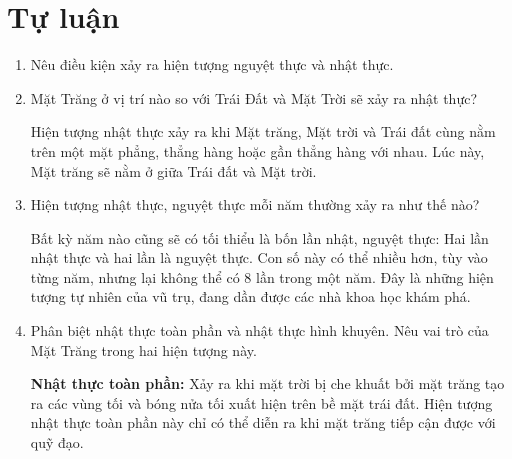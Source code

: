 \section{Tự luận}
\begin{enumerate}[label=\bfseries Câu \arabic*:]
	\item {}
	
	{
		Nêu điều kiện xảy ra hiện tượng nguyệt thực và nhật thực.
	}
	
	
	\item {}
	
	
	{
		Mặt Trăng ở vị trí nào so với Trái Đất và Mặt Trời sẽ xảy ra nhật thực?
	}
	
	\hideall
	{
		Hiện tượng nhật thực xảy ra khi Mặt trăng, Mặt trời và Trái đất cùng nằm trên một mặt phẳng, thẳng hàng hoặc gần thẳng hàng với nhau. Lúc này, Mặt trăng sẽ nằm ở giữa Trái đất và Mặt trời.
	}
	\item {}
	
	
	{
		Hiện tượng nhật thực, nguyệt thực mỗi năm thường xảy ra như thế nào?
	}
	
	\hideall
	{
		Bất kỳ năm nào cũng sẽ có tối thiểu là bốn lần nhật, nguyệt thực: Hai lần nhật thực và hai lần là nguyệt thực. Con số này có thể nhiều hơn, tùy vào từng năm, nhưng lại không thể có 8 lần trong một năm. Đây là những hiện tượng tự nhiên của vũ trụ, đang dần được các nhà khoa học khám phá.
	}
	\item {}
	
	
	{
		Phân biệt nhật thực toàn phần và nhật thực hình khuyên. Nêu vai trò của Mặt Trăng trong hai hiện tượng này.
	}
	
	\hideall
	{
		\textbf{ Nhật thực toàn phần: }Xảy ra khi mặt trời bị che khuất bởi mặt trăng tạo ra các vùng tối và bóng nửa tối xuất hiện trên bề mặt trái đất. Hiện tượng nhật thực toàn phần này chỉ có thể diễn ra khi mặt trăng tiếp cận được với quỹ đạo.
		
}
\end{enumerate}
